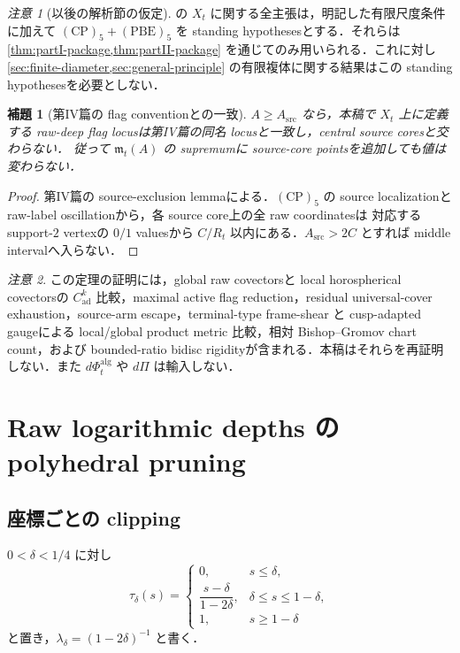 \documentclass[a4paper,11pt]{ltjsarticle}
\numberwithin{equation}{section}
\theoremstyle{plain}
\newtheorem{lemma}[lemma]{補題}
\theoremstyle{definition}
\theoremstyle{remark}
\newtheorem{remark}[remark]{注意}
\begin{document}
\begin{remark}[以後の解析節の仮定]\label{rem:standing-analytic-hypotheses}
 の $X_t$ に関する全主張は，明記した有限尺度条件に加えて $\mathrm{(CP)}_5+\mathrm{(PBE)}_5$ を standing hypothesesとする．それらは \cref{thm:partI-package,thm:partII-package} を通じてのみ用いられる．これに対し \cref{sec:finite-diameter,sec:general-principle} の有限複体に関する結果はこの standing hypothesesを必要としない．
\end{remark}

\begin{lemma}[第IV篇の flag conventionとの一致]\label{lem:partIII-flag-convention}
$A\ge A_{\mathrm{src}}$ なら，本稿で $X_t$ 上に定義する raw-deep flag locusは第IV篇の同名 locusと一致し，central source coresと交わらない．
従って $\mathfrak m_t(A)$ の supremumに source-core pointsを追加しても値は変わらない．
\end{lemma}

\begin{proof}
第IV篇の source-exclusion lemmaによる．$\mathrm{(CP)}_5$ の source localizationと raw-label oscillationから，各 source core上の全 raw coordinatesは
対応する support-$2$ vertexの $0/1$ valuesから $C/R_t$ 以内にある．$A_{\mathrm{src}}>2C$ とすれば middle intervalへ入らない．
\end{proof}

\begin{remark}\label{rem:partII-import-scope}
この定理の証明には，global raw covectorsと local horospherical covectorsの $C^k_{\mathrm{ad}}$ 比較，maximal active flag reduction，residual universal-cover exhaustion，source-arm escape，terminal-type frame-shear と cusp-adapted gaugeによる local/global product metric 比較，相対 Bishop--Gromov chart count，および bounded-ratio bidisc rigidityが含まれる．本稿はそれらを再証明しない．また $d\Phi_t^{\mathrm{alg}}$ や $d\Pi$ は輸入しない．
\end{remark}

\section{Raw logarithmic depths の polyhedral pruning}\label{sec:pruning}

\subsection{座標ごとの clipping}

$0<\delta<1/4$ に対し
\begin{equation}\label{eq:tau-delta}
 \tau_\delta(s)=
 \begin{cases}
 0,&s\le\delta,\\[1mm]
 \dfrac{s-\delta}{1-2\delta},&\delta\le s\le1-\delta,\\[3mm]
 1,&s\ge1-\delta
 \end{cases}
\end{equation}
と置き，$\lambda_\delta=(1-2\delta)^{-1}$ と書く．
\end{document}
